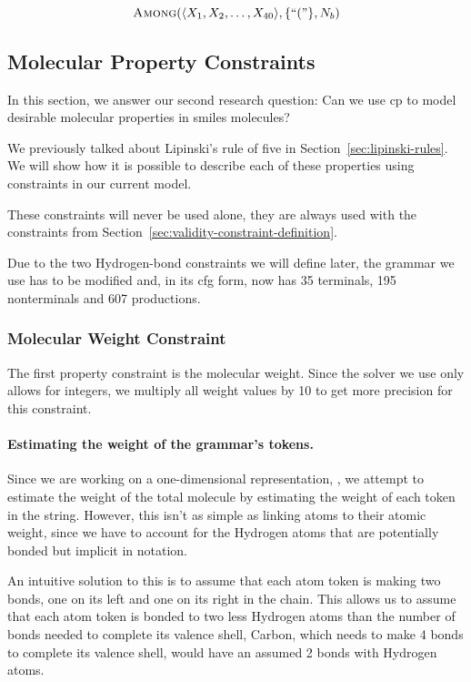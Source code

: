 \documentclass[../Document.tex]{subfiles}
\begin{document}
$$
    \mbox{\sc Among}(\langle X_1, X_2, \ldots, X_{40} \rangle, \{``("\}, N_b)
$$


\subsection{Molecular Property Constraints}
\label{sec:property-constraints-definition}
In this section, we answer our second research question: Can we use \acrshort{cp} to model desirable molecular properties in \acrshort{smiles} molecules?

We previously talked about Lipinski's rule of five in Section~\ref{sec:lipinski-rules}. We will show how it is possible to describe each of these properties using constraints in our current model.

These constraints will never be used alone, they are always used with the constraints from Section~\ref{sec:validity-constraint-definition}.

Due to the two Hydrogen-bond constraints we will define later, the grammar we use has to be modified and, in its \gls{cfg} form, now has 35 terminals, 195 nonterminals and 607 productions.

\subsubsection{Molecular Weight Constraint}
The first property constraint is the molecular weight.
Since the solver we use only allows for integers, we multiply all weight values by 10 to get more precision for this constraint.

\paragraph{Estimating the weight of the grammar's tokens.}
Since we are working on a one-dimensional representation, \smiles, we attempt to estimate the weight of the total molecule by estimating the weight of each token in the \smiles string.
However, this isn't as simple as linking atoms to their atomic weight, since we have to account for the Hydrogen atoms that are potentially bonded but implicit in \smiles notation.

An intuitive solution to this is to assume that each atom token is making two bonds, one on its left and one on its right in the \smiles chain.
This allows us to assume that each atom token is bonded to two less Hydrogen atoms than the number of bonds needed to complete its valence shell, \eg Carbon, which needs to make 4 bonds to complete its valence shell, would have an assumed 2 bonds with Hydrogen atoms.
\end{document}
